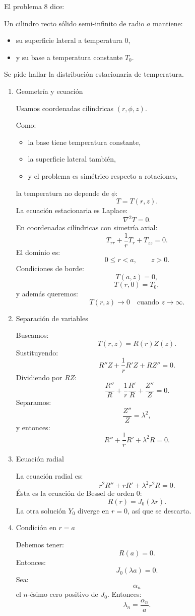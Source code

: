 \documentclass[11pt,spanish]{article}
\newcounter{problema}
\begin{document}
El problema 8 dice: 

Un cilindro recto sólido semi-infinito de radio $a$ mantiene:
\begin{itemize}
\item su superficie lateral a temperatura 0,
\item y su base a temperatura constante $T_0$.
\end{itemize}
Se pide hallar la distribución estacionaria de temperatura.

\begin{enumerate}
\item Geometría y ecuación

Usamos coordenadas cilíndricas $(r,\phi,z)$.

Como:
\begin{itemize}
\item la base tiene temperatura constante,
\item la superficie lateral también,
\item y el problema es simétrico respecto a rotaciones,
\end{itemize}
la temperatura no depende de $\phi$:
$$
T=T(r,z).
$$
La ecuación estacionaria es Laplace:
$$
\nabla^2 T=0.
$$
En coordenadas cilíndricas con simetría axial:
$$
T_{rr}+\frac1rT_r+T_{zz}=0.
$$
El dominio es:
$$
0\le r<a,
\qquad
z>0.
$$
Condiciones de borde:
$$
T(a,z)=0,
$$
$$
T(r,0)=T_0,
$$
y además queremos:
$$
T(r,z)\to0
\quad\text{cuando }z\to\infty.
$$

\item Separación de variables

Buscamos:
$$
T(r,z)=R(r)Z(z).
$$
Sustituyendo:
$$
R''Z+\frac1rR'Z+RZ''=0.
$$
Dividiendo por $RZ$:
$$
\frac{R''}{R}
+\frac1r\frac{R'}{R}
+\frac{Z''}{Z}=0.
$$
Separamos:
$$
\frac{Z''}{Z}=\lambda^2,
$$
y entonces:
$$
R''+\frac1rR'+\lambda^2R=0.
$$

\item Ecuación radial

La ecuación radial es:
$$
r^2R''+rR'+\lambda^2 r^2R=0.
$$
Ésta es la ecuación de Bessel de orden 0:
$$
R(r)=J_0(\lambda r).
$$
La otra solución $Y_0$ diverge en $r=0$, así que se descarta.

\item Condición en $r=a$

Debemos tener:
$$
R(a)=0.
$$
Entonces:
$$
J_0(\lambda a)=0.
$$
Sea:
$$
\alpha_n
$$
el $n$-ésimo cero positivo de $J_0$.
Entonces:
$$
\lambda_n=\frac{\alpha_n}{a}.
$$



\end{enumerate}
\end{document}
